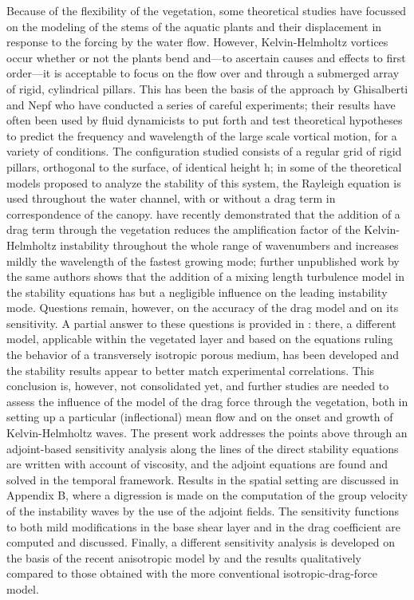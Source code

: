 Because of the flexibility of the vegetation, some theoretical studies have focussed on the
modeling of the stems of the aquatic plants and their displacement in response to the forcing by the
water flow. \cite{py2004mixing} \cite{patil2010characteristics} However, Kelvin-Helmholtz vortices occur whether or not the plants bend and—to ascertain causes and effects to first order—it is acceptable to focus on the flow over and through a
submerged array of rigid, cylindrical pillars. This has been the basis of the approach by Ghisalberti
and Nepf \cite{ghisalberti2002mixing} \cite{ghisalberti2004limited} \cite{ghisalberti2005mass} who have conducted a series of careful experiments; their results have often been
used by fluid dynamicists to put forth and test theoretical hypotheses to predict the frequency and
wavelength of the large scale vortical motion, for a variety of conditions. The configuration studied
consists of a regular grid of rigid pillars, orthogonal to the surface, of identical height h; in some
of the theoretical models proposed to analyze the stability of this system, the Rayleigh equation is
used throughout the water channel, with or without a drag term in correspondence of the canopy. \cite{raupach1996coherent} \cite{py2004mixing} \cite{singh2016linear}
\cite{zampogna2016instability} have recently demonstrated that the addition of a drag term through the vegetation reduces the amplification factor of the Kelvin-Helmholtz instability throughout the whole
range of wavenumbers and increases mildly the wavelength of the fastest growing mode; further
unpublished work by the same authors shows that the addition of a mixing length turbulence model
in the stability equations has but a negligible influence on the leading instability mode. Questions
remain, however, on the accuracy of the drag model and on its sensitivity. A partial answer to these
questions is provided in \cite{zampogna2016instability}: there, a different model, applicable within the vegetated layer and
based on the equations ruling the behavior of a transversely isotropic porous medium, has been
developed and the stability results appear to better match experimental correlations. This conclusion
is, however, not consolidated yet, and further studies are needed to assess the influence of the model
of the drag force through the vegetation, both in setting up a particular (inflectional) mean flow and
on the onset and growth of Kelvin-Helmholtz waves.
The present work addresses the points above through an adjoint-based sensitivity analysis along
the lines of \cite{bottaro2003effect} the direct stability equations are written with account of viscosity, and
the adjoint equations are found and solved in the temporal framework. Results in the spatial setting
are discussed in Appendix B, where a digression is made on the computation of the group velocity
of the instability waves by the use of the adjoint fields. The sensitivity functions to both mild
modifications in the base shear layer and in the drag coefficient are computed and discussed. Finally,
a different sensitivity analysis is developed on the basis of the recent anisotropic model by \cite{zampogna2016instability} and the results qualitatively compared to those obtained with the more conventional
isotropic-drag-force model.



